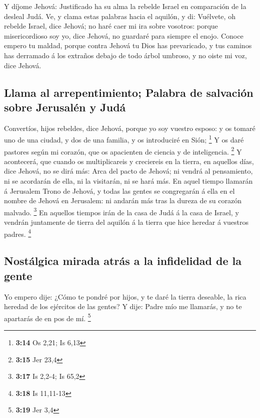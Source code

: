  Y díjome Jehová: Justificado ha su alma la rebelde Israel
en comparación de la desleal Judá.  Ve, y clama estas
palabras hacia el aquilón, y di: Vuélvete, oh rebelde Israel, dice
Jehová; no haré caer mi ira sobre vosotros: porque misericordioso soy
yo, dice Jehová, no guardaré para siempre el enojo.  Conoce
empero tu maldad, porque contra Jehová tu Dios has prevaricado, y tus
caminos has derramado á los extraños debajo de todo árbol umbroso, y no
oiste mi voz, dice Jehová.

\hypertarget{llama-al-arrepentimiento-palabra-de-salvaciuxf3n-sobre-jerusaluxe9n-y-juduxe1}{%
\subsection{Llama al arrepentimiento; Palabra de salvación sobre
Jerusalén y
Judá}\label{llama-al-arrepentimiento-palabra-de-salvaciuxf3n-sobre-jerusaluxe9n-y-juduxe1}}

 Convertíos, hijos rebeldes, dice Jehová, porque yo soy
vuestro esposo: y os tomaré uno de una ciudad, y dos de una familia, y
os introduciré en Sión; \footnote{\textbf{3:14} Os 2,21; Is 6,13}
 Y os daré pastores según mi corazón, que os apacienten de
ciencia y de inteligencia. \footnote{\textbf{3:15} Jer 23,4}
 Y acontecerá, que cuando os multiplicareis y creciereis en
la tierra, en aquellos días, dice Jehová, no se dirá más: Arca del pacto
de Jehová; ni vendrá al pensamiento, ni se acordarán de ella, ni la
visitarán, ni se hará más.  En aquel tiempo llamarán á
Jerusalem Trono de Jehová, y todas las gentes se congregarán á ella en
el nombre de Jehová en Jerusalem: ni andarán más tras la dureza de su
corazón malvado. \footnote{\textbf{3:17} Is 2,2-4; Is 65,2}
 En aquellos tiempos irán de la casa de Judá á la casa de
Israel, y vendrán juntamente de tierra del aquilón á la tierra que hice
heredar á vuestros padres. \footnote{\textbf{3:18} Is 11,11-13}

\hypertarget{nostuxe1lgica-mirada-atruxe1s-a-la-infidelidad-de-la-gente}{%
\subsection{Nostálgica mirada atrás a la infidelidad de la
gente}\label{nostuxe1lgica-mirada-atruxe1s-a-la-infidelidad-de-la-gente}}

 Yo empero dije: ¿Cómo te pondré por hijos, y te daré la
tierra deseable, la rica heredad de los ejércitos de las gentes? Y dije:
Padre mío me llamarás, y no te apartarás de en pos de mí. \footnote{\textbf{3:19}
  Jer 3,4}

